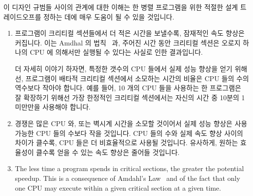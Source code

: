 이 디자인 규범들 사이의 관계에 대한 이해는 한 병렬 프로그램을 위한 적절한 설계
트레이드오프를 정하는 데에 매우 도움이 될 수 있을 것입니다.
\iffalse

Note that these criteria may also appear as part of the requirements
specification.
For example, speedup may act as a relative desideratum
(``the faster, the better'')
or as an absolute requirement of the workload (``the system
must support at least 1,000,000 web hits per second'').
Classic design pattern languages describe relative desiderata as forces
and absolute requirements as context.

An understanding of the relationships between these design criteria can
be very helpful when identifying appropriate design tradeoffs for a
parallel program.
\fi
\begin{enumerate}
\item	프로그램이 크리티컬 섹션들에서 더 적은 시간을 보낼수록, 잠재적인 속도
	향상은 커집니다.
	이는 Amdhal 의 법칙~\cite{GeneAmdahl1967AmdahlsLaw} 과, 주어진 시간
	동안 크리티컬 섹션은 오로지 하나의 CPU 에 의해서만 실행될 수 있다는
	사실로 인한 결과입니다.

	더 자세히 이야기 하자면, 특정한 갯수의 CPU 들에서 실제 성능 향상을 얻기
	위해선, 프로그램이 배타적 크리티컬 섹션에서 소모하는 시간의 비율은 CPU
	들의 수의 역수보다 작아야 합니다.
	예를 들어, 10 개의 CPU 들을 사용하는 한 프로그램은 잘 확장하기 위해선
	가장 한정적인 크리티컬 섹션에서는 자신의 시간 중 10분의 1 미만만을
	사용해야 합니다.
\item	경쟁은 많은 CPU 와, 또는 벽시계 시간을 소모할 것이어서 실제 성능 향상은
	사용 가능한 CPU 들의 수보다 작을 것입니다.
	CPU 들의 수와 실제 속도 향상 사이의 차이가 클수록, CPU 들은 더
	비효율적으로 사용될 것입니다.
	유사하게, 원하는 효율성이 클수록 얻을 수 있는 속도 향상은 줄어들
	것입니다.
\iffalse

\item	The less time a program spends in critical sections,
	the greater the potential speedup.
	This is a consequence of Amdahl's Law~\cite{GeneAmdahl1967AmdahlsLaw}
	and of the fact that only one CPU may execute within a given
	critical section at a given time.


\end{enumerate}
